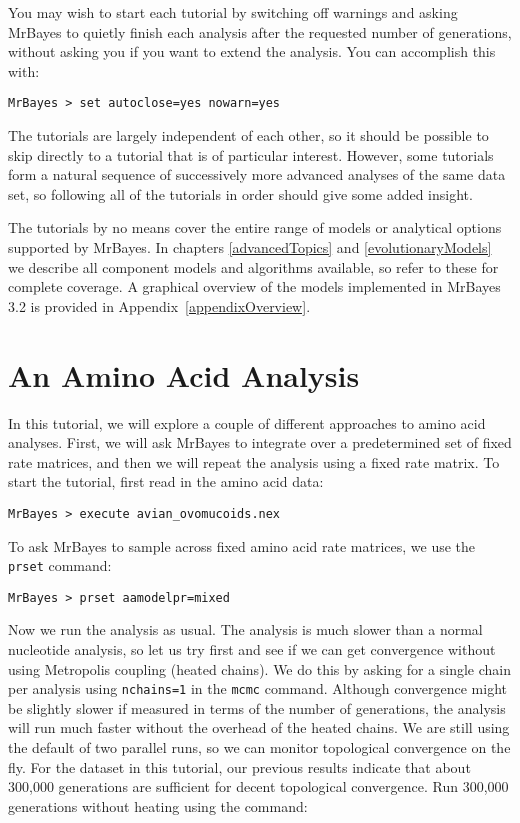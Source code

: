 \documentclass[12pt]{book}
\begin{document}
You may wish to start each tutorial by switching off warnings and asking MrBayes to quietly finish
each analysis after the requested number of generations, without asking you if you want to extend
the analysis. You can accomplish this with:

\begin{Verbatim}
MrBayes > set autoclose=yes nowarn=yes
\end{Verbatim}

The tutorials are largely independent of each other, so it should be possible to skip directly to a
tutorial that is of particular interest. However, some tutorials form a natural sequence of
successively more advanced analyses of the same data set, so following all of the tutorials in
order should give some added insight.

The tutorials by no means cover the entire range of models or analytical options supported by
MrBayes. In chapters \ref{advancedTopics} and \ref{evolutionaryModels} we describe all component
models and algorithms available, so refer to these for complete coverage. A graphical overview of
the models implemented in MrBayes 3.2 is provided in Appendix~\ref{appendixOverview}. 

\section{An Amino Acid Analysis}

In this tutorial, we will explore a couple of different approaches to amino acid analyses. First,
we will ask MrBayes to integrate over a predetermined set of fixed rate matrices, and then we will
repeat the analysis using a fixed rate matrix. To start the tutorial, first read in the amino acid
data:

\begin{Verbatim}
MrBayes > execute avian_ovomucoids.nex
\end{Verbatim}

To ask MrBayes to sample across fixed amino acid rate matrices, we use the \texttt{prset} command:

\begin{Verbatim}
MrBayes > prset aamodelpr=mixed
\end{Verbatim}

Now we run the analysis as usual. The analysis is much slower than a normal nucleotide analysis, so
let us try first and see if we can get convergence without using Metropolis coupling (heated
chains). We do this by asking for a single chain per analysis using \texttt{nchains=1} in the
\texttt{mcmc} command. Although convergence might be slightly slower if measured in terms of the
number of generations, the analysis will run much faster without the overhead of the heated chains.
We are still using the default of two parallel runs, so we can monitor topological convergence on
the fly. For the dataset in this tutorial, our previous results indicate that about 300,000
generations are sufficient for decent topological convergence. Run 300,000 generations without
heating using the command:
\end{document}
